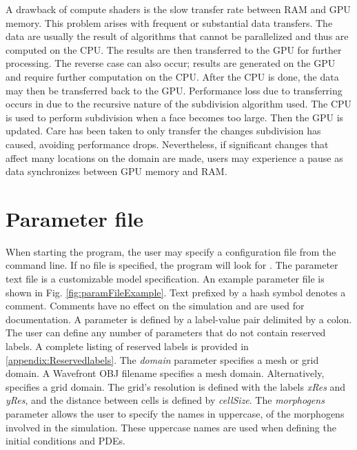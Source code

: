 A drawback of compute shaders is the slow transfer rate between RAM and GPU memory. This problem arises with frequent or substantial data transfers. The data are usually the result of algorithms that cannot be parallelized and thus are computed on the CPU. The results are then transferred to the GPU for further processing. The reverse case can also occur; results are generated on the GPU and require further computation on the CPU. After the CPU is done, the data may then be transferred back to the GPU. Performance loss due to transferring occurs in \ProgramName{} due to the recursive nature of the subdivision algorithm used. The CPU is used to perform subdivision when a face becomes too large. Then the GPU is updated. Care has been taken to only transfer the changes subdivision has caused, avoiding performance drops. Nevertheless, if significant changes that affect many locations on the domain are made, users may experience a pause as data synchronizes between GPU memory and RAM. 

\section{Parameter file}
When starting the program, the user may specify a configuration file from the command line. If no file is specified, the program will look for . The parameter text file is a customizable model specification. An example parameter file is shown in Fig. \ref{fig:paramFileExample}. Text prefixed by a hash symbol denotes a comment. Comments have no effect on the simulation and are used for documentation. A parameter is defined by a label-value pair delimited by a colon. The user can define any number of parameters that do not contain reserved labels. A complete listing of reserved labels is provided in \ref{appendix:Reservedlabels}. The \textit{domain} parameter specifies a mesh or grid domain. A Wavefront OBJ filename specifies a mesh domain. Alternatively,  specifies a grid domain. The grid's resolution is defined with the labels \textit{xRes} and \textit{yRes}, and the distance between cells is defined by \textit{cellSize}. The  \textit{morphogens} parameter allows the user to specify the names in uppercase, of the morphogens involved in the simulation. These uppercase names are used when defining the initial conditions and PDEs.

